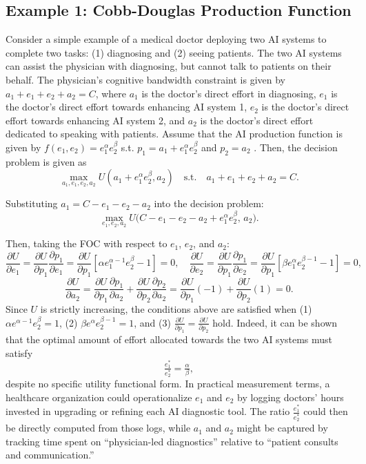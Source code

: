 \documentclass[11pt]{article}
\theoremstyle{definition}
\theoremstyle{remark}
\begin{document}
\subsection{Example 1: Cobb-Douglas Production Function}
\label{ssec:Cobb}
Consider a simple example of a medical doctor deploying two AI systems to complete two tasks: (1) diagnosing and (2) seeing patients. The two AI systems can assist the physician with diagnosing, but cannot talk to patients on their behalf. The physician's cognitive bandwidth constraint is given by $a_1+e_1+e_2+a_2=C$, where $a_1$ is the doctor's direct effort in diagnosing, $e_1$ is the doctor's direct effort towards enhancing AI system 1, $e_2$ is the doctor's direct effort towards enhancing AI system 2, and $a_2$ is the doctor's direct effort dedicated to speaking with patients. Assume that the AI production function is given by $f(e_1,e_2)=e_1^\alpha e_2^{\beta}$ s.t. $p_1=a_1+e_1^\alpha e_2^{\beta}$ and $p_2=a_2$ \citep{cobb1928theory}. Then, the decision problem is given as
\[
\max_{a_1,e_1,e_2,a_2}U(a_1+e_1^\alpha e_2^{\beta},a_2)
\quad
\text{s.t.}
\quad
a_1+e_1+e_2+a_2=C.
\]

Substituting $a_1=C-e_1-e_2-a_2$ into the decision problem:
\[
\max_{e_1,e_2,a_2}U\bigl(C-e_1-e_2-a_2+e_1^\alpha e_2^{\beta},\,a_2\bigr).
\]

Then, taking the FOC with respect to $e_1$, $e_2$, and $a_2$:
\[
\frac{\partial U}{\partial e_1}=\frac{\partial U}{\partial p_1}\frac{\partial p_1}{\partial e_1}
=\frac{\partial U}{\partial p_1}[\alpha e_1^{\alpha-1}e_2^{\beta}-1]=0,\quad
\frac{\partial U}{\partial e_2}=\frac{\partial U}{\partial p_1}\frac{\partial p_1}{\partial e_2}
=\frac{\partial U}{\partial p_1}[\beta e_1^{\alpha}e_2^{\beta-1}-1]=0,
\]
\[
\frac{\partial U}{\partial a_2}
=\frac{\partial U}{\partial p_1}\frac{\partial p_1}{\partial a_2}+\frac{\partial U}{\partial p_2}\frac{\partial p_2}{\partial a_2}
=\frac{\partial U}{\partial p_1}(-1)+\frac{\partial U}{\partial p_2}(1)=0.
\]
Since $U$ is strictly increasing, the conditions above are satisfied when (1) $\alpha e^{\alpha-1}e_2^{\beta}=1$, (2) $\beta e^{\alpha}e_2^{\beta-1}=1$, and (3) $\tfrac{\partial U}{\partial p_1}=\tfrac{\partial U}{\partial p_2}$ hold. Indeed, it can be shown that the optimal amount of effort allocated towards the two AI systems must satisfy
\[
\tfrac{e^*_1}{e^*_2}=\tfrac{\alpha}{\beta},
\]
despite no specific utility functional form. In practical measurement terms, a healthcare organization could operationalize $e_1$ and $e_2$ by logging doctors' hours invested in upgrading or refining each AI diagnostic tool. The ratio $\tfrac{e_1^*}{e_2^*}$ could then be directly computed from those logs, while $a_1$ and $a_2$ might be captured by tracking time spent on “physician-led diagnostics” relative to “patient consults and communication.”
\end{document}
